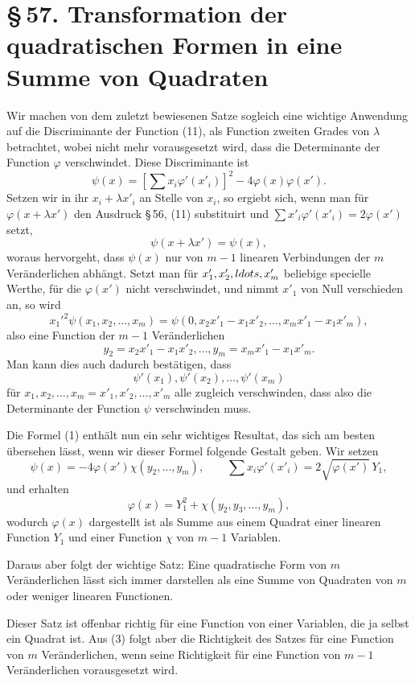 \documentclass[11pt]{article}
\providecommand{\sect}[2]{\section*{\S\,#1. #2}}
\begin{document}
\sect{57}{Transformation der quadratischen Formen in eine Summe von Quadraten}

Wir machen von dem zuletzt bewiesenen Satze sogleich eine wichtige Anwendung auf die Discriminante der Function (11), als Function zweiten Grades von $\lambda$ betrachtet, wobei nicht mehr vorausgesetzt wird, dass die Determinante der Function $\varphi$ verschwindet. Diese Discriminante ist
\begin{equation}
 \psi(x)=\left[\sum x_i\varphi'(x'_i)\right]^2-4\varphi(x)\varphi(x').
\tag{1}
\end{equation}
Setzen wir in ihr $x_i+\lambda x'_i$ an Stelle von $x_i$, so ergiebt sich, wenn man für $\varphi(x+\lambda x')$ den Ausdruck \S\,56, (11) substituirt und $\sum x'_i\varphi'(x'_i)=2\varphi(x')$ setzt,
\[
 \psi(x+\lambda x')=\psi(x),
\]
woraus hervorgeht, dass $\psi(x)$ nur von $m-1$ linearen Verbindungen der $m$ Veränderlichen abhängt. Setzt man für $x'_1,x'_2,\\ldots,x'_m$ beliebige specielle Werthe, für die $\varphi(x')$ nicht verschwindet, und nimmt $x'_1$ von Null verschieden an, so wird
\[
 x_1'^2\psi(x_1,x_2,\ldots,x_m)=
 \psi(0,x_2x'_1-x_1x'_2,\ldots,x_mx'_1-x_1x'_m),
\]
also eine Function der $m-1$ Veränderlichen
\[
 y_2=x_2x'_1-x_1x'_2,
 \ldots,
 y_m=x_mx'_1-x_1x'_m.
\]
Man kann dies auch dadurch bestätigen, dass
\[
 \psi'(x_1),\psi'(x_2),\ldots,\psi'(x_m)
\]
für $x_1,x_2,\ldots,x_m=x'_1,x'_2,\ldots,x'_m$ alle zugleich verschwinden, dass also die Determinante der Function $\psi$ verschwinden muss.

Die Formel (1) enthält nun ein sehr wichtiges Resultat, das sich am besten übersehen lässt, wenn wir dieser Formel folgende Gestalt geben. Wir setzen
\begin{equation}
 \psi(x)=-4\varphi(x')\chi(y_2,\ldots,y_m),
 \qquad
 \sum x_i\varphi'(x'_i)=2\sqrt{\varphi(x')}\,Y_1,
\tag{2}
\end{equation}
und erhalten
\begin{equation}
 \varphi(x)=Y_1^2+\chi(y_2,y_3,\ldots,y_m),
\tag{3}
\end{equation}
wodurch $\varphi(x)$ dargestellt ist als Summe aus einem Quadrat einer linearen Function $Y_1$ und einer Function $\chi$ von $m-1$ Variablen.

Daraus aber folgt der wichtige Satz: Eine quadratische Form von $m$ Veränderlichen lässt sich immer darstellen als eine Summe von Quadraten von $m$ oder weniger linearen Functionen.

Dieser Satz ist offenbar richtig für eine Function von einer Variablen, die ja selbst ein Quadrat ist. Aus (3) folgt aber die Richtigkeit des Satzes für eine Function von $m$ Veränderlichen, wenn seine Richtigkeit für eine Function von $m-1$ Veränderlichen vorausgesetzt wird.
\end{document}
